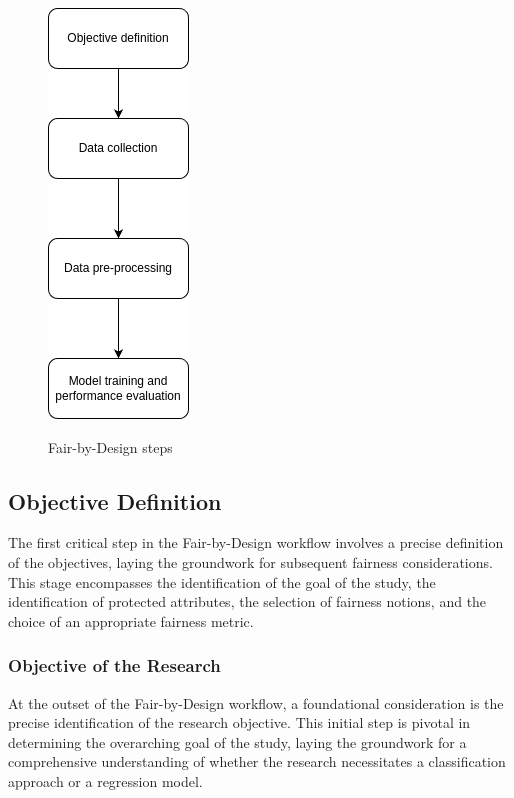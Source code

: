 \begin{figure}[H]
    \centering
    \includegraphics[width=.3\textwidth, height=.8\textwidth]{workflow-steps.png}
    \label{fig:steps}
    \caption{Fair-by-Design steps}
\end{figure}
    

\subsection{Objective Definition}
\label{subsection:objective}

The first critical step in the Fair-by-Design workflow involves a precise definition of the objectives, laying the groundwork for subsequent fairness considerations. This stage encompasses the identification of the goal of the study, the identification of protected attributes, the selection of fairness notions, and the choice of an appropriate fairness metric.

\subsubsection{Objective of the Research}

At the outset of the Fair-by-Design workflow, a foundational consideration is the precise identification of the research objective. This initial step is pivotal in determining the overarching goal of the study, laying the groundwork for a comprehensive understanding of whether the research necessitates a classification approach or a regression model.

